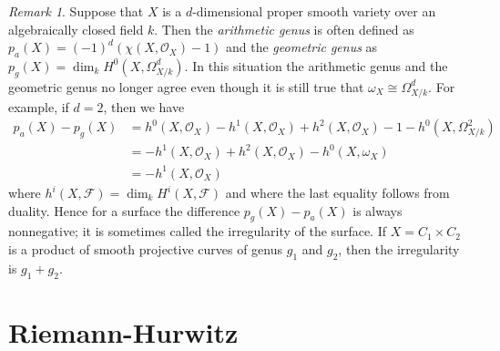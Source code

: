 \documentclass{stacks-project}
\theoremstyle{plain}
\theoremstyle{definition}
\theoremstyle{remark}
\newtheorem{remark}[subsection]{Remark}
\numberwithin{equation}{subsection}
\begin{document}
\begin{remark}
\label{remark-genus-higher-dimension}
Suppose that $X$ is a $d$-dimensional proper smooth variety over
an algebraically closed field $k$.
Then the {\it arithmetic genus} is often defined as
$p_a(X) = (-1)^d(\chi(X, \mathcal{O}_X) - 1)$ and the {\it geometric genus}
as $p_g(X) = \dim_k H^0(X, \Omega^d_{X/k})$. In this situation
the arithmetic genus and the geometric genus no longer agree
even though it is still true that $\omega_X \cong \Omega_{X/k}^d$.
For example, if $d = 2$, then we have
\begin{align*}
p_a(X) - p_g(X) & =
h^0(X, \mathcal{O}_X) - h^1(X, \mathcal{O}_X) + h^2(X, \mathcal{O}_X) - 1
- h^0(X, \Omega^2_{X/k}) \\
& =
- h^1(X, \mathcal{O}_X) + h^2(X, \mathcal{O}_X) - h^0(X, \omega_X) \\
& =
- h^1(X, \mathcal{O}_X)
\end{align*}
where $h^i(X, \mathcal{F}) = \dim_k H^i(X, \mathcal{F})$ and
where the last equality follows from duality.
Hence for a surface the difference $p_g(X) - p_a(X)$ is always
nonnegative; it is sometimes called the irregularity of the surface.
If $X = C_1 \times C_2$ is a product of smooth projective curves of
genus $g_1$ and $g_2$, then the irregularity is $g_1 + g_2$.
\end{remark}






\section{Riemann-Hurwitz}
\label{section-riemann-hurewitz}
\end{document}
